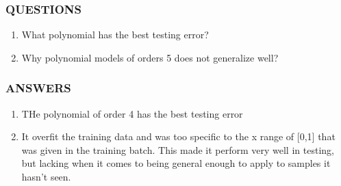 \documentclass[11pt]{article}
\begin{document}
    \subsubsection{QUESTIONS}\label{questions}

\begin{enumerate}
\def\labelenumi{(\arabic{enumi})}
\item
  What polynomial has the best testing error?
\item
  Why polynomial models of orders 5 does not generalize well?
\end{enumerate}

    \subsubsection{ANSWERS}\label{answers}

\begin{enumerate}
\def\labelenumi{(\arabic{enumi})}
\item
  THe polynomial of order 4 has the best testing error
\item
  It overfit the training data and was too specific to the x range of
  {[}0,1{]} that was given in the training batch. This made it perform
  very well in testing, but lacking when it comes to being general
  enough to apply to samples it hasn't seen.
\end{enumerate}


    
    
    
    
\end{document}
